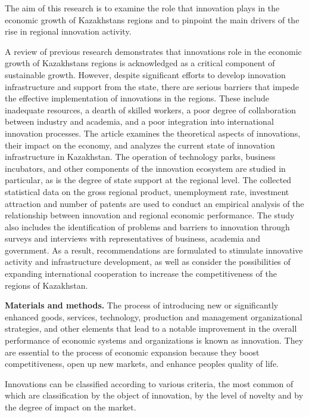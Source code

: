 The aim of this research is to examine the role that innovation plays in
the economic growth of Kazakhstan\textquotesingle s regions and to
pinpoint the main drivers of the rise in regional innovation activity.

A review of previous research demonstrates that
innovation\textquotesingle s role in the economic growth of
Kazakhstan\textquotesingle s regions is acknowledged as a critical
component of sustainable growth. However, despite significant efforts to
develop innovation infrastructure and support from the state, there are
serious barriers that impede the effective implementation of innovations
in the regions. These include inadequate resources, a dearth of skilled
workers, a poor degree of collaboration between industry and academia,
and a poor integration into international innovation processes. The
article examines the theoretical aspects of innovations, their impact on
the economy, and analyzes the current state of innovation infrastructure
in Kazakhstan. The operation of technology parks, business incubators,
and other components of the innovation ecosystem are studied in
particular, as is the degree of state support at the regional level. The
collected statistical data on the gross regional product, unemployment
rate, investment attraction and number of patents are used to conduct an
empirical analysis of the relationship between innovation and regional
economic performance. The study also includes the identification of
problems and barriers to innovation through surveys and interviews with
representatives of business, academia and government. As a result,
recommendations are formulated to stimulate innovative activity and
infrastructure development, as well as consider the possibilities of
expanding international cooperation to increase the competitiveness of
the regions of Kazakhstan.

{\bfseries Materials and methods.} The process of introducing new or
significantly enhanced goods, services, technology, production and
management organizational strategies, and other elements that lead to a
notable improvement in the overall performance of economic systems and
organizations is known as innovation. They are essential to the process
of economic expansion because they boost competitiveness, open up new
markets, and enhance people\textquotesingle s quality of life.

Innovations can be classified according to various criteria, the most
common of which are classification by the object of innovation, by the
level of novelty and by the degree of impact on the market.


